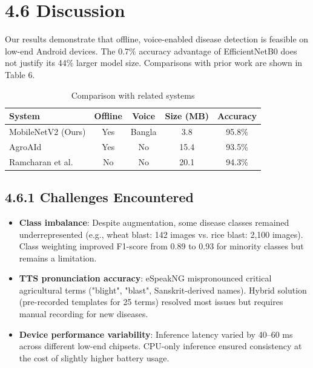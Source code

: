 \documentclass[12pt,letterpaper]{report}
\begin{document}
\section*{4.6 Discussion}

Our results demonstrate that offline, voice-enabled disease detection is feasible on low-end Android devices. The 0.7\% accuracy advantage of EfficientNetB0 does not justify its 44\% larger model size. Comparisons with prior work are shown in Table 6.

\begin{table}[H]
\centering
\caption{Comparison with related systems}
\label{tab:comparison}
\begin{tabular}{@{}lcccc@{}}
\toprule
\textbf{System} & \textbf{Offline} & \textbf{Voice} & \textbf{Size (MB)} & \textbf{Accuracy} \\
\midrule
MobileNetV2 (Ours) & Yes & Bangla & 3.8 & 95.8\% \\
AgroAId \cite{ref8} & Yes & No & 15.4 & 93.5\% \\
Ramcharan et al.\ \cite{ref6} & No & No & 20.1 & 94.3\% \\
\bottomrule
\end{tabular}
\end{table}

\subsection*{4.6.1 Challenges Encountered}
\begin{itemize}
    \item \textbf{Class imbalance}: Despite augmentation, some disease classes remained underrepresented (e.g., wheat blast: 142 images vs. rice blast: 2,100 images). Class weighting improved F1-score from 0.89 to 0.93 for minority classes but remains a limitation.
    \item \textbf{TTS pronunciation accuracy}: eSpeakNG mispronounced critical agricultural terms ("blight", "blast", Sanskrit-derived names). Hybrid solution (pre-recorded templates for 25 terms) resolved most issues but requires manual recording for new diseases.
    \item \textbf{Device performance variability}: Inference latency varied by 40–60 ms across different low-end chipsets. CPU-only inference ensured consistency at the cost of slightly higher battery usage.
\end{itemize}
\end{document}
